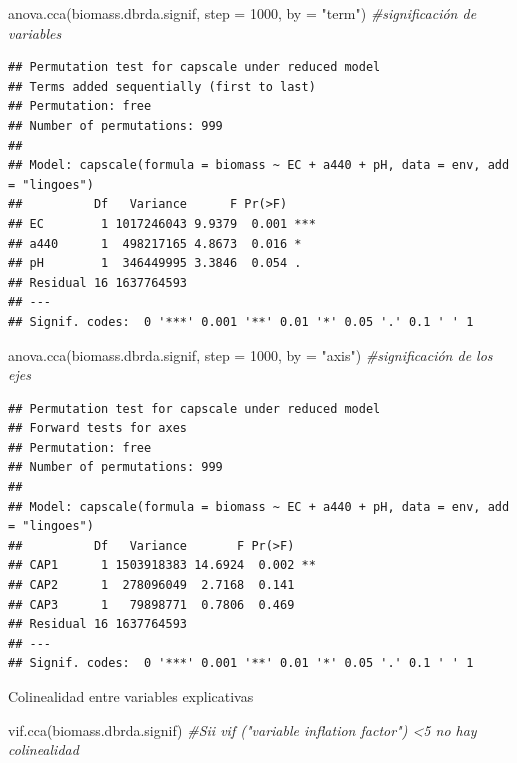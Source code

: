 \documentclass[
]{book}
\newenvironment{Shaded}{\begin{snugshade}}{\end{snugshade}}
\newcommand{\AttributeTok}[1]{\textcolor[rgb]{0.77,0.63,0.00}{#1}}
\newcommand{\CommentTok}[1]{\textcolor[rgb]{0.56,0.35,0.01}{\textit{#1}}}
\newcommand{\DecValTok}[1]{\textcolor[rgb]{0.00,0.00,0.81}{#1}}
\newcommand{\FunctionTok}[1]{\textcolor[rgb]{0.00,0.00,0.00}{#1}}
\newcommand{\NormalTok}[1]{#1}
\newcommand{\StringTok}[1]{\textcolor[rgb]{0.31,0.60,0.02}{#1}}
\begin{document}
\begin{Shaded}
\begin{Highlighting}[]
\FunctionTok{anova.cca}\NormalTok{(biomass.dbrda.signif, }\AttributeTok{step =} \DecValTok{1000}\NormalTok{, }\AttributeTok{by =} \StringTok{"term"}\NormalTok{) }\CommentTok{\#significación de variables }
\end{Highlighting}
\end{Shaded}

\begin{verbatim}
## Permutation test for capscale under reduced model
## Terms added sequentially (first to last)
## Permutation: free
## Number of permutations: 999
## 
## Model: capscale(formula = biomass ~ EC + a440 + pH, data = env, add = "lingoes")
##          Df   Variance      F Pr(>F)    
## EC        1 1017246043 9.9379  0.001 ***
## a440      1  498217165 4.8673  0.016 *  
## pH        1  346449995 3.3846  0.054 .  
## Residual 16 1637764593                  
## ---
## Signif. codes:  0 '***' 0.001 '**' 0.01 '*' 0.05 '.' 0.1 ' ' 1
\end{verbatim}

\begin{Shaded}
\begin{Highlighting}[]
\FunctionTok{anova.cca}\NormalTok{(biomass.dbrda.signif, }\AttributeTok{step =} \DecValTok{1000}\NormalTok{, }\AttributeTok{by =} \StringTok{"axis"}\NormalTok{) }\CommentTok{\#significación de los ejes}
\end{Highlighting}
\end{Shaded}

\begin{verbatim}
## Permutation test for capscale under reduced model
## Forward tests for axes
## Permutation: free
## Number of permutations: 999
## 
## Model: capscale(formula = biomass ~ EC + a440 + pH, data = env, add = "lingoes")
##          Df   Variance       F Pr(>F)   
## CAP1      1 1503918383 14.6924  0.002 **
## CAP2      1  278096049  2.7168  0.141   
## CAP3      1   79898771  0.7806  0.469   
## Residual 16 1637764593                  
## ---
## Signif. codes:  0 '***' 0.001 '**' 0.01 '*' 0.05 '.' 0.1 ' ' 1
\end{verbatim}

Colinealidad entre variables explicativas

\begin{Shaded}
\begin{Highlighting}[]
\FunctionTok{vif.cca}\NormalTok{(biomass.dbrda.signif) }\CommentTok{\#Sii vif ("variable inflation factor") \textless{}5 no hay colinealidad}
\end{Highlighting}
\end{Shaded}
\end{document}
